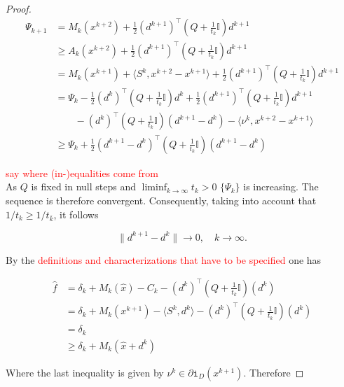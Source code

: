 \begin{proof}
	\begin{align}
		\Psi_{k+1} &= M_k(x^{k+2})+\frac{1}{2}\left(d^{k+1}\right)^{\top}\left(Q+\frac{1}{t_k}\mathbb{I} \right)d^{k+1} \\
		&\geq A_k(x^{k+2})+\frac{1}{2}\left(d^{k+1}\right)^{\top}\left(Q+\frac{1}{t_k}\mathbb{I}\right)d^{k+1} \\
		&= M_k(x^{k+1})+\langle S^k,x^{k+2}-x^{k+1} \rangle +\frac{1}{2}\left(d^{k+1}\right)^{\top}\left(Q+\frac{1}{t_k}\mathbb{I}\right)d^{k+1} \\
		&= \Psi_k - \frac{1}{2}\left(d^{k}\right)^{\top}\left(Q+\frac{1}{t_k}\mathbb{I}\right)d^{k} + \frac{1}{2}\left(d^{k+1}\right)^{\top}\left(Q+\frac{1}{t_k}\mathbb{I}\right)d^{k+1} \\
		& \qquad -\left(d^{k}\right)^{\top}\left(Q+\frac{1}{t_k}\mathbb{I}\right)\left(d^{k+1} - d^{k}\right) - \langle \nu^k, x^{k+2}-x^{k+1}\rangle\\
		&\geq \Psi_k + \frac{1}{2}\left(d^{k+1}-d^{k}\right)^{\top}\left(Q+\frac{1}{t_k}\mathbb{I}\right)\left(d^{k+1} - d^{k}\right)
	\end{align}
	
\textcolor{red}{say where (in-)equalities come from} \\

As \(Q\) is fixed in null steps and \(\liminf_{k \to \infty} t_k > 0\) \(\{\Psi_k\}\) is increasing. The sequence is therefore convergent.
Consequently, taking into account that \(1/t_k \geq 1/t_{\bar{k}}\), it follows

\begin{equation}
	\|d^{k+1}-d^k\| \to 0, \quad k \to \infty.
\label{d_to_0}
\end{equation}

By the \textcolor{red}{definitions and characterizations that have to be specified} one has

\begin{align}
	\hat{f} &= \delta_k+M_k(\hat{x})-C_k-\left(d^{k}\right)^{\top}\left(Q+\frac{1}{t_k}\mathbb{I}\right)\left(d^{k}\right) \\
	&= \delta_k + M_k(x^{k+1})-\langle S^k,d^k \rangle-\left(d^{k}\right)^{\top}\left(Q+\frac{1}{t_k}\mathbb{I}\right)\left(d^{k}\right)  \\
	&= \delta_k \\
	&\geq \delta_k+M_k(\hat{x}+d^k)
\end{align}

Where the last inequality is given by \(\nu^k \in \partial\mathtt{i}_{D}(x^{k+1})\). Therefore 


\end{proof}
